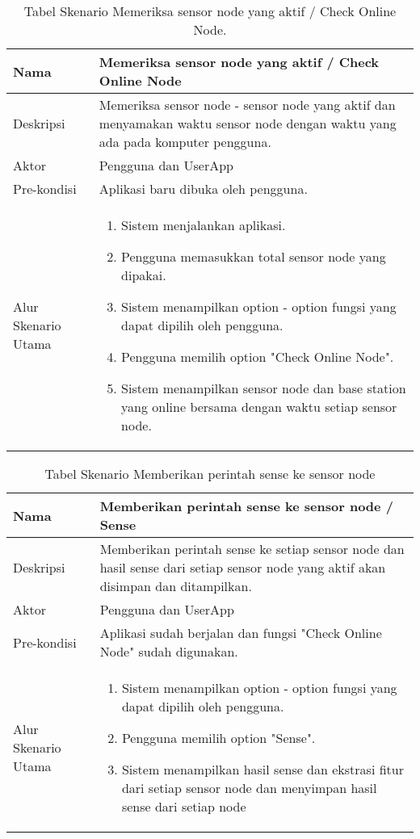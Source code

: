 \begin{table}[H]
    \centering
    \caption{Tabel Skenario Memeriksa sensor node yang aktif / Check Online Node.}
    \begin{tabular}{|p{3cm}|p{10cm}|}
    \hline
        Nama & Memeriksa sensor node yang aktif / Check Online Node\\
    \hline 
    \hline
        Deskripsi & Memeriksa sensor node - sensor node yang aktif dan menyamakan waktu sensor node dengan waktu yang ada pada komputer pengguna. \\
    \hline
        Aktor & Pengguna dan UserApp\\
    \hline
        Pre-kondisi & Aplikasi baru dibuka oleh pengguna. \\
    \hline
        Alur Skenario Utama & 
        \begin{enumerate}
            \item Sistem menjalankan aplikasi.
            \item Pengguna memasukkan total sensor node yang dipakai.
            \item Sistem menampilkan option - option fungsi yang dapat dipilih oleh pengguna.
            \item Pengguna memilih option "Check Online Node".
            \item Sistem menampilkan sensor node dan base station yang online bersama dengan waktu setiap sensor node. 
        \end{enumerate}\\
    \hline
    \end{tabular}
    \label{tab:skenario1}
\end{table}

\begin{table}[H]
    \centering
    \caption{Tabel Skenario Memberikan perintah sense ke sensor node}
    \begin{tabular}{|p{3cm}|p{10cm}|}
    \hline
        Nama & Memberikan perintah sense ke sensor node / Sense\\
    \hline 
    \hline
        Deskripsi & Memberikan perintah sense ke setiap sensor node dan hasil sense dari setiap sensor node yang aktif akan disimpan dan ditampilkan. \\
    \hline
        Aktor & Pengguna dan UserApp\\
    \hline
        Pre-kondisi & Aplikasi sudah berjalan dan fungsi "Check Online Node" sudah digunakan. \\
    \hline
        Alur Skenario Utama & 
         \begin{enumerate}
            \item Sistem menampilkan option - option fungsi yang dapat dipilih oleh pengguna.
            \item Pengguna memilih option "Sense".
            \item Sistem menampilkan hasil sense dan ekstrasi fitur dari setiap sensor node dan menyimpan hasil sense dari setiap node
        \end{enumerate}\\
    \hline
    \end{tabular}
    \label{tab:skenario2}
\end{table}

